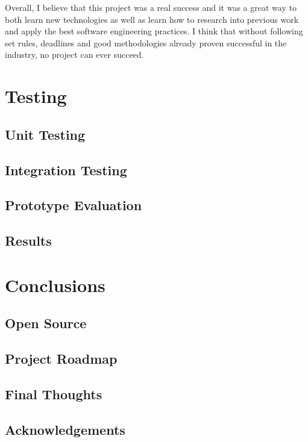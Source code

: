 \documentclass{l4proj}
\begin{document}
Overall, I believe that this project was a real success and it was a great way to both learn new technologies as well as
learn how to research into previous work and apply the best software engineering practices. I think that without
following set rules, deadlines and good methodologies already proven successful in the industry, no project can ever
succeed.


\chapter{Testing}
\label{testing}

\section{Unit Testing}

\section{Integration Testing}

\section{Prototype Evaluation}

\section{Results}


\chapter{Conclusions}
\label{conclusions}

\section{Open Source}

\section{Project Roadmap}

\section{Final Thoughts}

\section{Acknowledgements}



\end{document}
